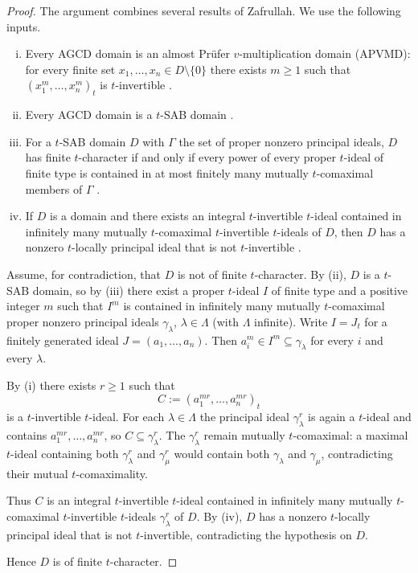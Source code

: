 \documentclass[11pt,reqno]{amsart}
\numberwithin{equation}{section}
\theoremstyle{definition}
\begin{document}
\begin{proof}
The argument combines several results of Zafrullah. We use the
following inputs.

\begin{enumerate}[(i)]
\item Every AGCD domain is an almost Pr\"ufer $v$-multiplication domain
      (APVMD): for every finite set $x_1,\dots,x_n\in D\setminus\{0\}$
      there exists $m\ge 1$ such that $(x_1^m,\dots,x_n^m)_t$ is
      $t$-invertible \cite[Lemma 4.3(6)]{Zafrullah-UniversalRestriction}.
\item Every AGCD domain is a $t$-SAB domain
      \cite[Lemma 4.3(13)]{Zafrullah-UniversalRestriction}.
\item For a $t$-SAB domain $D$ with $\Gamma$ the set of proper nonzero
      principal ideals, $D$ has finite $t$-character if and only if every
      power of every proper $t$-ideal of finite type is contained in at
      most finitely many mutually $t$-comaximal members of $\Gamma$
      \cite[Corollary 6]{Zafrullah-UniversalRestriction}.
\item If $D$ is a domain and there exists an integral $t$-invertible
      $t$-ideal contained in infinitely many mutually $t$-comaximal
      $t$-invertible $t$-ideals of $D$, then $D$ has a nonzero
      $t$-locally principal ideal that is not $t$-invertible
      \cite[Proposition 4]{Zafrullah-BazzoniLike}.
\end{enumerate}

Assume, for contradiction, that $D$ is not of finite $t$-character. By
(ii), $D$ is a $t$-SAB domain, so by (iii) there exist a proper $t$-ideal
$I$ of finite type and a positive integer $m$ such that $I^m$ is
contained in infinitely many mutually $t$-comaximal proper nonzero
principal ideals $\gamma_\lambda$, $\lambda\in\Lambda$ (with $\Lambda$
infinite). Write $I=J_t$ for a finitely generated ideal
$J=(a_1,\dots,a_n)$. Then $a_i^m\in I^m\subseteq\gamma_\lambda$ for every
$i$ and every $\lambda$.

By (i) there exists $r\ge 1$ such that
\[
   C:=(a_1^{mr},\dots,a_n^{mr})_t
\]
is a $t$-invertible $t$-ideal. For each $\lambda\in\Lambda$ the principal
ideal $\gamma_\lambda^r$ is again a $t$-ideal and contains
$a_1^{mr},\dots,a_n^{mr}$, so $C\subseteq\gamma_\lambda^r$. The
$\gamma_\lambda^r$ remain mutually $t$-comaximal: a maximal $t$-ideal
containing both $\gamma_\lambda^r$ and $\gamma_\mu^r$ would contain both
$\gamma_\lambda$ and $\gamma_\mu$, contradicting their mutual
$t$-comaximality.

Thus $C$ is an integral $t$-invertible $t$-ideal contained in infinitely
many mutually $t$-comaximal $t$-invertible $t$-ideals $\gamma_\lambda^r$
of $D$. By (iv), $D$ has a nonzero $t$-locally principal ideal that is
not $t$-invertible, contradicting the hypothesis on $D$.

Hence $D$ is of finite $t$-character.
\end{proof}
\end{document}

